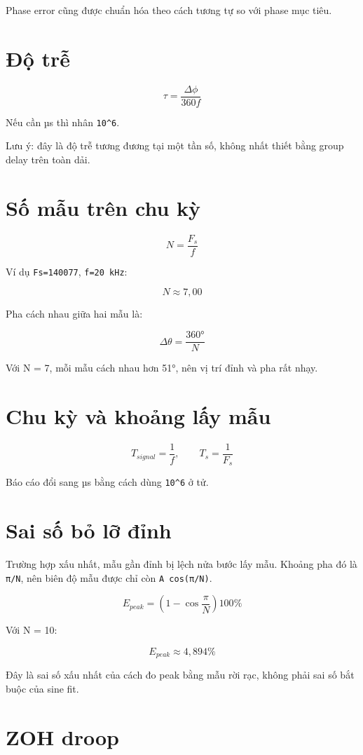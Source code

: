 \documentclass[12pt,a4paper,oneside]{article}
\newcommand{\inlinecode}[1]{\texttt{#1}}
\begin{document}
Phase error cũng được chuẩn hóa theo cách tương tự so với phase mục tiêu.

\section{Độ trễ}

\[
\tau=\frac{\Delta\phi}{360f}
\]

Nếu cần µs thì nhân \inlinecode{10\textasciicircum{}6}.

Lưu ý: đây là độ trễ tương đương tại một tần số, không nhất thiết bằng group delay trên toàn dải.

\section{Số mẫu trên chu kỳ}

\[
N=\frac{F_s}{f}
\]

Ví dụ \inlinecode{Fs=140077}, \inlinecode{f=20 kHz}:

\[
N\approx 7,00
\]

Pha cách nhau giữa hai mẫu là:

\[
\Delta\theta=\frac{360°}{N}
\]

Với N = 7, mỗi mẫu cách nhau hơn 51°, nên vị trí đỉnh và pha rất nhạy.

\section{Chu kỳ và khoảng lấy mẫu}

\[
T_{signal}=\frac{1}{f},\qquad T_s=\frac{1}{F_s}
\]

Báo cáo đổi sang µs bằng cách dùng \inlinecode{10\textasciicircum{}6} ở tử.

\section{Sai số bỏ lỡ đỉnh}

Trường hợp xấu nhất, mẫu gần đỉnh bị lệch nửa bước lấy mẫu. Khoảng pha đó là \inlinecode{π/N}, nên biên độ mẫu được chỉ còn \inlinecode{A cos(π/N)}.

\[
E_{peak}=\left(1-\cos\frac{\pi}{N}\right)100\%
\]

Với N = 10:

\[
E_{peak}\approx 4,894\%
\]

Đây là sai số xấu nhất của cách đo peak bằng mẫu rời rạc, không phải sai số bắt buộc của sine fit.

\section{ZOH droop}
\end{document}
